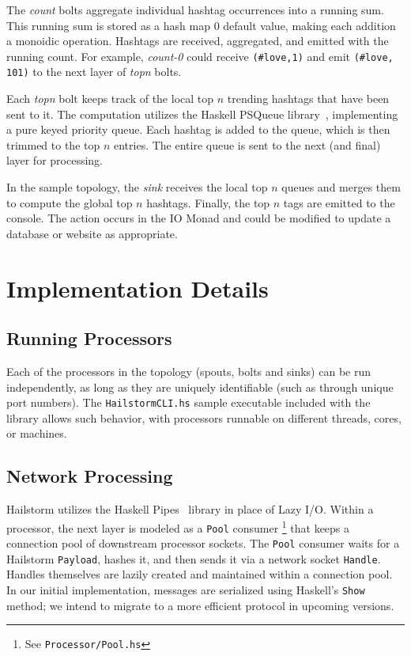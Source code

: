 \documentclass[10pt,nocopyrightspace]{sigplanconf}
\begin{document}
The \textit{count} bolts aggregate individual hashtag occurrences into a running
sum. This running sum is stored as a hash map 0 default value, making each addition 
a monoidic operation. Hashtags are received, aggregated, and emitted with the running count.
For example, \textit{count-0} could receive \texttt{(\#love,1)} and emit
\texttt{(\#love, 101)} to the next layer of \textit{topn} bolts.

Each \textit{topn} bolt keeps track of the local top $n$ trending hashtags 
that have been sent to it. The computation utilizes the Haskell PSQueue
library~\cite{psqueue}, implementing a pure keyed priority queue. Each hashtag
is added to the queue, which is then trimmed to the top $n$ entries. The entire
queue is sent to the next (and final) layer for processing.

In the sample topology, the \textit{sink} receives the local top $n$ queues 
and merges them to compute the global top $n$ hashtags. Finally, the top $n$
tags are emitted to the console. The action occurs in the IO Monad and could be 
modified to update a database or website as appropriate.

\section{Implementation Details}

\subsection{Running Processors}

Each of the processors in the topology (spouts, bolts and sinks) can be run
independently, as long as they are uniquely identifiable (such as through
unique port numbers). The \texttt{HailstormCLI.hs} sample executable included
with the library allows such behavior, with processors runnable on different
threads, cores, or machines.

\subsection{Network Processing}
\label{sec:network-processing}
Hailstorm utilizes the Haskell Pipes~\cite{pipes} library
in place of Lazy I/O. Within
a processor, the next layer is modeled as a \lstinline{Pool} consumer%
\footnote{See \texttt{Processor/Pool.hs}} that keeps a connection pool
of downstream processor sockets. The \lstinline{Pool} consumer waits for a
Hailstorm \lstinline{Payload}, hashes it, and then sends it via a network socket
\lstinline{Handle}. Handles themselves are lazily created and maintained within a
connection pool. In our initial implementation, messages are serialized using
Haskell's \texttt{Show} method; we intend to migrate to a more efficient
protocol in upcoming versions.
\end{document}
